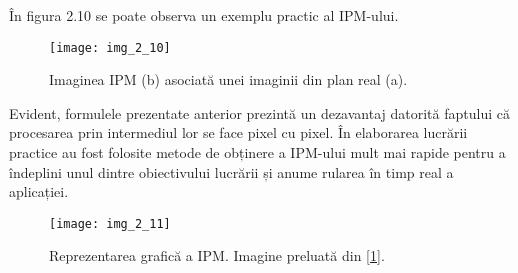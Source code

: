 În figura 2.10 se poate observa un exemplu practic al IPM-ului.

\begin{figure}[!h]
	\centering
	\texttt{[image: img\_2\_10]}
	\caption[Imagine IPM]{Imaginea IPM (b) asociată unei imaginii din plan real (a).}
	\label{fig:nonfloat}
\end{figure}

Evident, formulele prezentate anterior prezintă un dezavantaj datorită faptului că procesarea prin intermediul lor se face pixel cu pixel. În elaborarea lucrării practice au fost folosite metode de obținere a IPM-ului mult mai rapide pentru a îndeplini unul dintre obiectivului lucrării și anume rularea în timp real a aplicației.

\begin{figure}[!h]
	\centering
	\texttt{[image: img\_2\_11]}
	\caption[Reprezentare grafică IPM]{Reprezentarea grafică a IPM. Imagine preluată din \hyperlink{AnuarMikdadMuadAiniHussainSalinaAbdulSamadMohdMarzukiMustaffaBurhanuddinYeopMajlis}{[1]}.}
	\label{fig:nonfloat}
\end{figure}